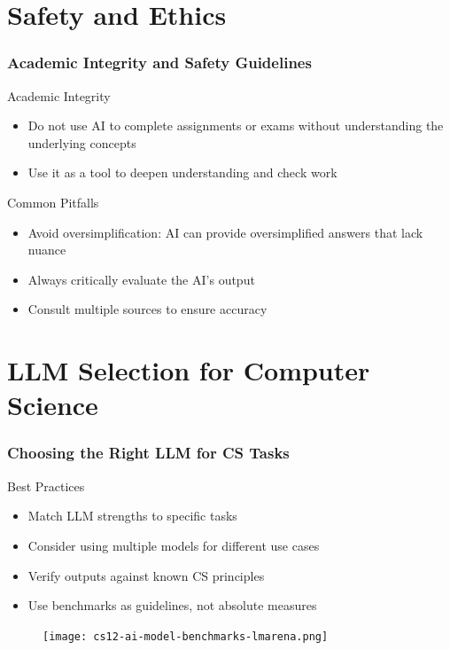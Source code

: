 \documentclass{beamer}
\begin{document}
\section{Safety and Ethics}
\frame{\sectionpage}
\begin{frame}
\frametitle{Academic Integrity and Safety Guidelines}
\begin{block}{Academic Integrity}
\begin{itemize}
\item Do not use AI to complete assignments or exams without understanding the underlying concepts
\item Use it as a tool to deepen understanding and check work
\end{itemize}
\end{block}

\begin{alertblock}{Common Pitfalls}
\begin{itemize}
\item Avoid oversimplification: AI can provide oversimplified answers that lack nuance
\item Always critically evaluate the AI's output
\item Consult multiple sources to ensure accuracy
\end{itemize}
\end{alertblock}
\end{frame}

\section{LLM Selection for Computer Science}
\frame{\sectionpage}

\begin{frame}
\frametitle{Choosing the Right LLM for CS Tasks}

\begin{block}{Best Practices}
\begin{itemize}
\item Match LLM strengths to specific tasks
\item Consider using multiple models for different use cases
\item Verify outputs against known CS principles
\item Use benchmarks as guidelines, not absolute measures
\end{itemize}
\end{block}
\begin{figure}
    \centering
    \texttt{[image: cs12-ai-model-benchmarks-lmarena.png]}
\end{figure}
\end{frame}
\end{document}
